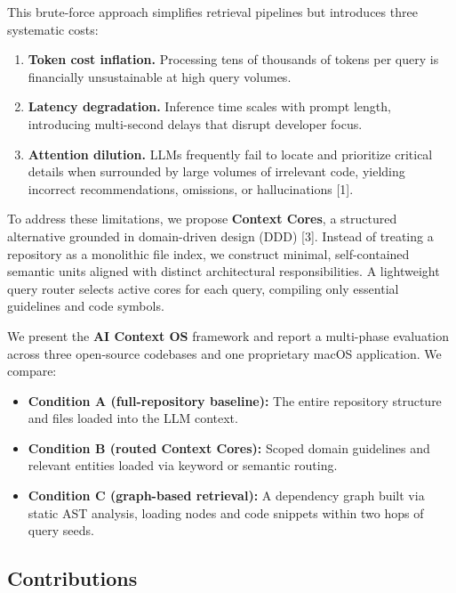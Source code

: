 \documentclass[11pt]{article}
\providecommand{\tightlist}{%
  \setlength{\itemsep}{2pt}%
  \setlength{\parskip}{0pt}%
}
\begin{document}
This brute-force approach simplifies retrieval pipelines but introduces
three systematic costs:

\begin{enumerate}
\def\labelenumi{\arabic{enumi}.}
\tightlist
\item
  \textbf{Token cost inflation.} Processing tens of thousands of tokens
  per query is financially unsustainable at high query volumes.
\item
  \textbf{Latency degradation.} Inference time scales with prompt
  length, introducing multi-second delays that disrupt developer focus.
\item
  \textbf{Attention dilution.} LLMs frequently fail to locate and
  prioritize critical details when surrounded by large volumes of
  irrelevant code, yielding incorrect recommendations, omissions, or
  hallucinations {[}1{]}.
\end{enumerate}

To address these limitations, we propose \textbf{Context Cores}, a
structured alternative grounded in domain-driven design (DDD) {[}3{]}.
Instead of treating a repository as a monolithic file index, we
construct minimal, self-contained semantic units aligned with distinct
architectural responsibilities. A lightweight query router selects
active cores for each query, compiling only essential guidelines and
code symbols.

We present the \textbf{AI Context OS} framework and report a multi-phase
evaluation across three open-source codebases and one proprietary macOS
application. We compare:

\begin{itemize}
\tightlist
\item
  \textbf{Condition A (full-repository baseline):} The entire repository
  structure and files loaded into the LLM context.
\item
  \textbf{Condition B (routed Context Cores):} Scoped domain guidelines
  and relevant entities loaded via keyword or semantic routing.
\item
  \textbf{Condition C (graph-based retrieval):} A dependency graph built
  via static AST analysis, loading nodes and code snippets within two
  hops of query seeds.
\end{itemize}

\subsection{Contributions}\label{contributions}
\end{document}
